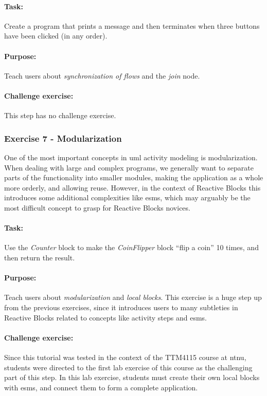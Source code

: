 \paragraph{Task:} Create a program that prints a message and then terminates when three buttons have been clicked (in any order).

\paragraph{Purpose:} Teach users about \emph{synchronization of flows} and the \emph{join} node.

\paragraph{Challenge exercise:} This step has no challenge exercise.

\subsubsection{Exercise 7 - Modularization}
One of the most important concepts in \gls{uml} activity modeling is modularization. When dealing with large and complex programs, we generally want to separate parts of the functionality into smaller modules, making the application as a whole more orderly, and allowing reuse. However, in the context of Reactive Blocks this introduces some additional complexities like \glspl{esm}, which may arguably be the most difficult concept to grasp for Reactive Blocks novices.

\paragraph{Task:} Use the \emph{Counter} block to make the \emph{CoinFlipper} block ``flip a coin'' 10 times, and then return the result.

\paragraph{Purpose:} Teach users about \emph{modularization} and \emph{local blocks}. This exercise is a huge step up from the previous exercises, since it introduces users to many subtleties in Reactive Blocks related to concepts like activity steps and \glspl{esm}.

\paragraph{Challenge exercise:} Since this tutorial was tested in the context of the TTM4115 course at \gls{ntnu}, students were directed to the first lab exercise of this course as the challenging part of this step. In this lab exercise, students must create their own local blocks with \glspl{esm}, and connect them to form a complete application.

